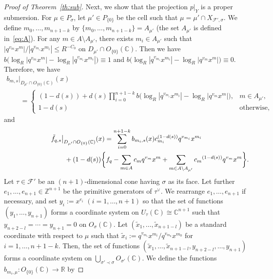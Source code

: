 \documentclass[10pt,a4paper]{amsart}
\numberwithin{equation}{section}
\begin{document}
\begin{proof}[Proof of Theorem~\ref{th:sub}]
Next, we show that the projection $\left. p \right|_Y$ is a proper submersion. For $\mu \in P_\sigma$, let $\mu' \in P_{\{0\}}$ be the cell such that $\mu = \mu' \cap X_{{\mathcal F}',\sigma}$. We def\/ine $m_0, \dots, m_{n+1-k}$ by $\{m_0, \dots, m_{n+1-k}\} =A_{\mu'}$ (the set $A_{\mu'}$ is def\/ined in~\eqref{eq:A}). For any $m \in A \setminus A_{\mu'}$, there exists $m_i \in A_{\mu'}$ such that $|q^{v_{m}}x^{m}|/|{q^{v_{m_i}}x^{m_i}}| \leq R^{-C_0}$ on $D_{\mu'} \cap O_{\{0\}}({\mathbb C})$. Then we have $b\big(\log_R|q^{v_{m}}x^{m}|-\log_R|{q^{v_{m_i}}x^{m_i}}|\big) \equiv 1$ and $b\big(\log_R|q^{v_{m_i}}x^{m_i}|-\log_R|{q^{v_{m}}x^{m}}|\big) \equiv 0$. Therefore, we have
\begin{gather*}
 b_{m,s} |_{D_{\mu'} \cap O_{\{0\}}({\mathbb C})}(x)\\
 \qquad{} =
\begin{cases}
(1-d(s))+d(s)\prod\limits_{i=0}^{n+1-k} b \big( \log_R|q^{v_{m_i}}x^{m_i}|-\log_R|{q^{v_{m}}x^{m}}| \big), & m \in A_{\mu'}, \\
1-d(s) &\mathrm{otherwise,}
\end{cases}
\end{gather*}
and
\begin{gather}
 \tilde{f}_{q,s} \big|_{D_{\mu'} \cap O_{\{0\}}({\mathbb C})}(x)= \sum_{i=0}^{n+1-k} b_{m_i,s}(x)c_{m_i}^{(1-d(s))}q^{v_{m_i}}x^{m_i}\nonumber\\
\hphantom{\tilde{f}_{q,s} \big|_{D_{\mu'} \cap O_{\{0\}}({\mathbb C})}(x)=}{}
+(1-d(s))\bigg\{ f_{q}-\sum_{m \in A}{c_{m}}q^{v_{m}}x^{m}+\sum_{m \in A \setminus A_{\mu'}}{c_{m}}^{(1-d(s))}q^{v_{m}}x^{m}\bigg\}.\label{eq:a}
\end{gather}
Let $\tau \in {\mathcal F}'$ be an $(n+1)$-dimensional cone having $\sigma$ as its face. Let further $e_1, \dots, e_{n+1} \in {\mathbb Z}^{n+1}$ be the primitive generators of $\tau^\vee$. We rearrange $e_1, \dots, e_{n+1}$ if necessary, and set $y_i:=x^{e_i}$ $(i=1,\dots, n+1)$ so that the set of functions $(y_1, \dots, y_{n+1})$ forms a coordinate system on $U_\tau({\mathbb C}) \cong {\mathbb C}^{n+1}$ such that $y_{n+2-l}= \cdots =y_{n+1}=0$ on $O_\sigma({\mathbb C})$. Let $(\tilde{x}_1, \dots, \tilde{x}_{n+1-l})$ be a standard coordinate with respect to $\mu$ such that $\tilde{x}_i:=q^{v_{m_i}}x^{m_i}/q^{v_{m_0}}x^{m_0}$ for $i=1, \dots, n+1-k$. Then, the set of functions $(\tilde{x}_1, \dots, \tilde{x}_{n+1-l}, y_{n+2-l}, \dots, y_{n+1})$ forms a coordinate system on $\bigcup_{\sigma' \prec \sigma} O_{\sigma'}({\mathbb C})$. We def\/ine the functions $b_{m_i,\mu} \colon O_{\{0\}}({\mathbb C}) \to {\mathbb R}$ by

\end{proof}
\end{document}
